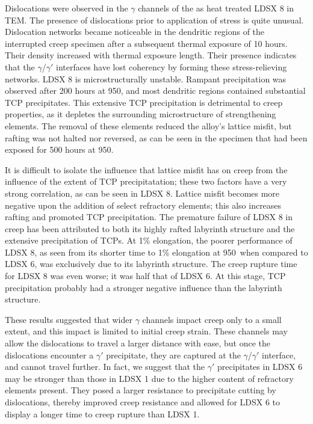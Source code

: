 Dislocations were observed in the $\gamma$ channels of the as heat treated LDSX 8 in TEM.  The presence of dislocations prior to application of stress is quite unusual.  Dislocation networks became noticeable in the dendritic regions of the interrupted creep specimen after a subsequent thermal exposure of 10 hours.  Their density increased with thermal exposure length.  Their presence indicates that the $\gamma$/$\gamma'$ interfaces have lost coherency by forming these stress-relieving networks. LDSX 8 is microstructurally unstable. Rampant precipitation was observed after 200 hours at 950\celsius, and most dendritic regions contained substantial TCP precipitates.  This extensive TCP precipitation is detrimental to creep properties, as it depletes the surrounding microstructure of strengthening elements.  The removal of these elements reduced the alloy's lattice misfit, but rafting was not halted nor reversed, as can be seen in the specimen that had been exposed for 500 hours at 950\celsius. 

It is difficult to isolate the influence that lattice misfit has on creep from the influence of the extent of TCP precipitatation; these two factors have a very strong correlation, as can be seen in LDSX 8. Lattice misfit becomes more negative upon the addition of select refractory elements; this also increases rafting and promoted TCP precipitation.  The premature failure of LDSX 8 in creep has been attributed to both its highly rafted labyrinth structure and the extensive precipitation of TCPs.  At 1\% elongation, the poorer performance of LDSX 8, as seen from its shorter time to 1\% elongation at 950\celsius\ when compared to LDSX 6, was exclusively due to its labyrinth structure.  The creep rupture time for LDSX 8 was even worse; it was half that of LDSX 6.  At this stage, TCP precipitation probably had a stronger negative influence than the labyrinth structure.

These results suggested that wider $\gamma$ channels impact creep only to a small extent, and this impact is limited to initial creep strain.  These channels may allow the dislocations to travel a larger distance with ease, but once the dislocations encounter a $\gamma'$ precipitate, they are captured at the $\gamma$/$\gamma'$ interface, and cannot travel further.  In fact, we suggest that the $\gamma'$ precipitates in LDSX 6 may be stronger than those in LDSX 1 due to the higher content of refractory elements present.  They posed a larger resistance to precipitate cutting by dislocations, thereby improved creep resistance and allowed for LDSX 6 to display a longer time to creep rupture than LDSX 1.

